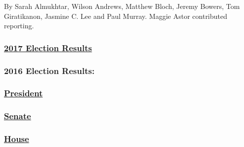 By Sarah Almukhtar, Wilson Andrews, Matthew Bloch, Jeremy Bowers, Tom
Giratikanon, Jasmine C. Lee and Paul Murray. Maggie Astor contributed
reporting.

\hypertarget{2017-election-results}{%
\subsubsection{\texorpdfstring{\href{https://www.nytimes3xbfgragh.onion/interactive/2017/us/elections/election-calendar.html}{2017
Election Results}}{2017 Election Results}}\label{2017-election-results}}

\hypertarget{2016-election-results}{%
\subsubsection{2016 Election Results:}\label{2016-election-results}}

\hypertarget{president}{%
\subsubsection{\texorpdfstring{\href{https://www.nytimes3xbfgragh.onion/elections/results/president}{President}}{President}}\label{president}}

\hypertarget{senate}{%
\subsubsection{\texorpdfstring{\href{https://www.nytimes3xbfgragh.onion/elections/results/senate}{Senate}}{Senate}}\label{senate}}

\hypertarget{house}{%
\subsubsection{\texorpdfstring{\href{https://www.nytimes3xbfgragh.onion/elections/results/house}{House}}{House}}\label{house}}

